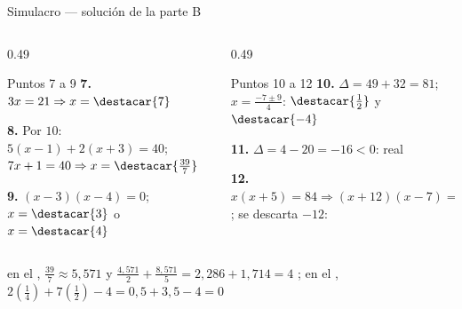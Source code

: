 \documentclass[aspectratio=169,10pt]{beamer}
\begin{document}
\begin{frame}{Simulacro — solución de la parte B}
  \scriptsize
  \begin{columns}[T,onlytextwidth]
    \begin{column}{0.49\textwidth}
      \begin{block}{Puntos 7 a 9}
        \tiny
        \textbf{7.} $3x=21 \Rightarrow x=\destacar{7}$

        \vspace{0.1cm}
        \textbf{8.} Por $10$: $5(x-1)+2(x+3)=40$;
        $7x+1=40 \Rightarrow x=\destacar{\tfrac{39}{7}}$

        \vspace{0.1cm}
        \textbf{9.} $(x-3)(x-4)=0$;
        $x=\destacar{3}$ o $x=\destacar{4}$
      \end{block}
    \end{column}
    \begin{column}{0.49\textwidth}
      \begin{block}{Puntos 10 a 12}
        \tiny
        \textbf{10.} $\Delta=49+32=81$; $x=\tfrac{-7\pm 9}{4}$:
        $\destacar{\tfrac{1}{2}}$ y $\destacar{-4}$

        \vspace{0.1cm}
        \textbf{11.} $\Delta = 4-20 = -16 < 0$:
         real

        \vspace{0.1cm}
        \textbf{12.} $x(x+5)=84 \Rightarrow (x+12)(x-7)=0$;
        se descarta $-12$: 
      \end{block}
    \end{column}
  \end{columns}

  \vspace{0.08cm}
  {\tiny\color{uniGris}  en el
  , $\tfrac{39}{7}\approx 5{,}571$ y
  $\tfrac{4{,}571}{2}+\tfrac{8{,}571}{5} = 2{,}286+1{,}714 = 4$ \checkmark; en
  el , $2(\tfrac14)+7(\tfrac12)-4 = 0{,}5+3{,}5-4 = 0$
  \checkmark}
\end{frame}
\end{document}

